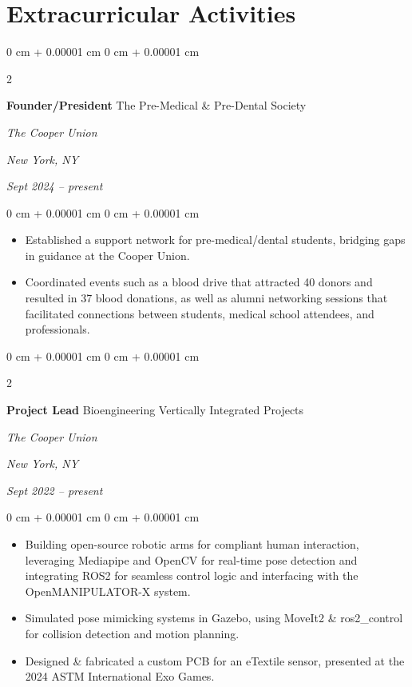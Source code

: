 \documentclass[11pt, letterpaper]{article}
\newenvironment{highlights}{
    \begin{itemize}[
        topsep=0.1 cm,
        parsep=0.1 cm,
        partopsep=0pt,
        itemsep=0pt,
        leftmargin=0 cm + 10pt
    ]
}{
    \end{itemize}
} %
\newenvironment{onecolentry}{
    \begin{adjustwidth}{
        0 cm + 0.00001 cm
    }{
        0 cm + 0.00001 cm
    }
}{
    \end{adjustwidth}
} %
\newenvironment{twocolentry}[2][]{
    \onecolentry
    \def\secondColumn{#2}
    \setcolumnwidth{\fill, 4.5 cm}
    \begin{paracol}{2}
}{
    \switchcolumn \raggedleft \secondColumn
    \end{paracol}
    \endonecolentry
} %
\begin{document}
    
    \section{Extracurricular Activities}



        
        \begin{twocolentry}{
        \textit{New York, NY}    
            
        \textit{Sept 2024 – present}}
            \textbf{Founder/President}
         \textbar{} \textnormal{The Pre-Medical \& Pre-Dental Society}    

            \textit{The Cooper Union}
        \end{twocolentry}

        \vspace{0.1 cm}
        \begin{onecolentry}
            \begin{highlights}
                \item Established a support network for pre-medical/dental students, bridging gaps in guidance at the Cooper Union.
                \item Coordinated events such as a blood drive that attracted 40 donors and resulted in 37 blood donations, as well as alumni networking sessions that facilitated connections between students, medical school attendees, and professionals.
            \end{highlights}
        \end{onecolentry}


        \vspace{0.15 cm}

        \begin{twocolentry}{
        \textit{New York, NY}    
            
        \textit{Sept 2022 – present}}
            \textbf{Project Lead}
         \textbar{} \textnormal{Bioengineering Vertically Integrated Projects}    

            \textit{The Cooper Union}
        \end{twocolentry}

        \vspace{0.1 cm}
        \begin{onecolentry}
            \begin{highlights}
                \item Building open-source robotic arms for compliant human interaction, leveraging Mediapipe and OpenCV for real-time pose detection and integrating ROS2 for seamless control logic and interfacing with the OpenMANIPULATOR-X system.
                \item Simulated pose mimicking systems in Gazebo, using MoveIt2 \& ros2\_control for collision detection and motion planning.
                \item Designed \& fabricated a custom PCB for an eTextile sensor, presented at the 2024 ASTM International Exo Games.
            \end{highlights}
        \end{onecolentry}
\end{document}
